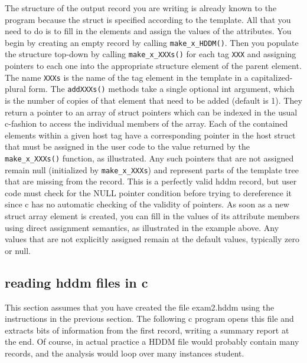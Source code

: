 \documentclass{revtex4}
\begin{document}
The structure of the output record you are writing is already known to the
program because the struct is specified according to the template. All that
you need to do is to fill in the elements and assign the values of the attributes.
You begin by creating an empty record by calling \texttt{make\_x\_HDDM()}.
Then you populate the structure top-{}down by calling \texttt{make\_x\_XXXs()}
for each tag \texttt{XXX} and assigning pointers to each one into the 
appropriate structure element of the parent element. The name \texttt{XXXs}
is the name of the tag element in the template in a capitalized-{}plural form.
The \texttt{addXXXs()} methods take a single optional int argument, which is
the number of copies of that element that need to be added (default is 1). 
They return a pointer to an array of struct pointers which can be indexed in
the usual c-{}fashion to access the individual members of the array. Each of
the contained elements within a given host tag have a corresponding pointer
in the host struct that must be assigned in the user code to the value returned
by the \texttt{make\_x\_XXXs()} function, as illustrated. Any such pointers
that are not assigned remain null (initialized by \texttt{make\_x\_XXXs}) and
represent parts of the template tree that are missing from the record. This
is a perfectly valid hddm record, but user code must check for the NULL
pointer condition before trying to dereference it since c has no automatic
checking of the validity of pointers. As soon as a new struct array element is
created, you can fill in the values of its attribute members using direct
assignment semantics, as illustrated in the example above. Any values that
are not explicitly assigned remain at the default values, typically zero or null.

\subsection{reading hddm files in c}

This section assumes that you have created the file exam2.hddm using the 
instructions in the previous section. The following c program opens this file
and extracts bits of information from the first record, writing a summary
report at the end. Of course, in actual practice a HDDM file would probably
contain many records, and the analysis would loop over many instances student.
\end{document}
